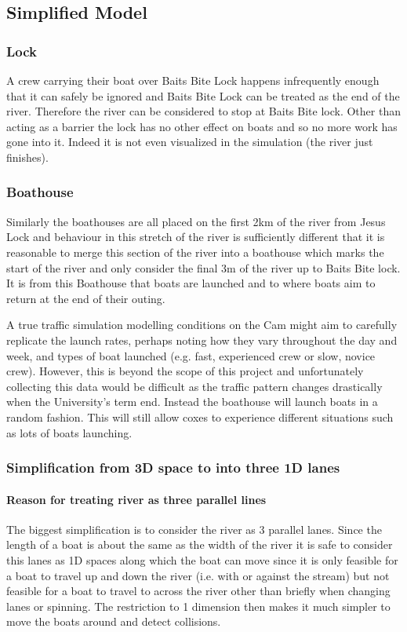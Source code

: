       \subsection{Simplified Model}
      
      \subsubsection{Lock}
      A crew carrying their boat over Baits Bite Lock happens infrequently enough that it can safely be ignored and Baits Bite Lock can be treated as the end of the river. Therefore the river can be considered to stop at Baits Bite lock. Other than acting as a barrier the lock has no other effect on boats and so no more work has gone into it. Indeed it is not even visualized in the simulation (the river just finishes).
      
      \subsubsection{Boathouse}
      Similarly the boathouses are all placed on the first 2km of the river from Jesus Lock and behaviour in this stretch of the river is sufficiently different that it is reasonable to merge this section of the river into a boathouse which marks the start of the river and only consider the final 3m of the river up to Baits Bite lock. It is from this Boathouse that boats are launched and to where boats aim to return at the end of their outing.
      
      A true traffic simulation modelling conditions on the Cam might aim to carefully replicate the launch rates, perhaps noting how they vary throughout the day and week, and types of boat launched (e.g. fast, experienced crew or slow, novice crew). However, this is beyond the scope of this project and unfortunately collecting this data would be difficult as the traffic pattern changes drastically when the University's term end. Instead the boathouse will launch boats in a random fashion. This will still allow coxes to experience different situations such as lots of boats launching.
      
      \subsubsection{Simplification from 3D space to into three 1D lanes}

      \paragraph{Reason for treating river as three parallel lines}      
      The biggest simplification is to consider the river as 3 parallel lanes. Since the length of a boat is about the same as the width of the river it is safe to consider this lanes as 1D spaces along which the boat can move since it is only feasible for a boat to travel up and down the river (i.e. with or against the stream) but not feasible for a boat to travel to across the river other than briefly when changing lanes or spinning. The restriction to 1 dimension then makes it much simpler to move the boats around and detect collisions.
      
